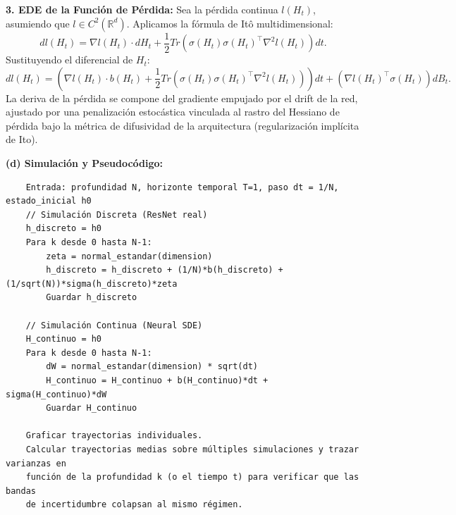 \documentclass[11pt, letterpaper]{article}
\begin{document}
\begin{solucion}
    \textbf{3. EDE de la Función de Pérdida:}
    Sea la pérdida continua $l(H_t)$, asumiendo que $l \in C^2(\mathbb{R}^d)$. Aplicamos la fórmula de Itô multidimensional:
    \[ dl(H_t) = \nabla l(H_t) \cdot dH_t + \frac{1}{2} Tr\left( \sigma(H_t)\sigma(H_t)^\top \nabla^2 l(H_t) \right) dt. \]
    Sustituyendo el diferencial de $H_t$:
    \[ dl(H_t) = \left( \nabla l(H_t) \cdot b(H_t) + \frac{1}{2} Tr\left( \sigma(H_t)\sigma(H_t)^\top \nabla^2 l(H_t) \right) \right) dt + \left( \nabla l(H_t)^\top \sigma(H_t) \right) dB_t. \]
    La deriva de la pérdida se compone del gradiente empujado por el drift de la red, ajustado por una penalización estocástica vinculada al rastro del Hessiano de pérdida bajo la métrica de difusividad de la arquitectura (regularización implícita de Ito).

    \textbf{(d) Simulación y Pseudocódigo:}
    \begin{verbatim}
    Entrada: profundidad N, horizonte temporal T=1, paso dt = 1/N, estado_inicial h0
    // Simulación Discreta (ResNet real)
    h_discreto = h0
    Para k desde 0 hasta N-1:
        zeta = normal_estandar(dimension)
        h_discreto = h_discreto + (1/N)*b(h_discreto) + (1/sqrt(N))*sigma(h_discreto)*zeta
        Guardar h_discreto
        
    // Simulación Continua (Neural SDE)
    H_continuo = h0
    Para k desde 0 hasta N-1:
        dW = normal_estandar(dimension) * sqrt(dt)
        H_continuo = H_continuo + b(H_continuo)*dt + sigma(H_continuo)*dW
        Guardar H_continuo

    Graficar trayectorias individuales.
    Calcular trayectorias medias sobre múltiples simulaciones y trazar varianzas en 
    función de la profundidad k (o el tiempo t) para verificar que las bandas 
    de incertidumbre colapsan al mismo régimen.
    \end{verbatim}
\end{solucion}
\end{document}
